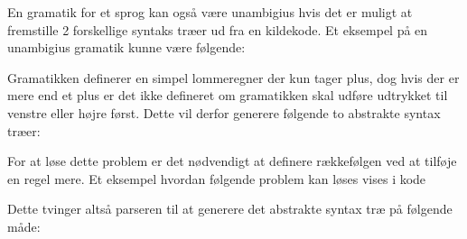 
En gramatik for et sprog kan også være unambigius hvis det er muligt at fremstille 2 forskellige syntaks træer ud fra en kildekode. Et eksempel på en unambigius gramatik kunne være følgende:


Gramatikken definerer en simpel lommeregner der kun tager plus, dog hvis der er mere end et plus er det ikke defineret om gramatikken skal udføre udtrykket til venstre eller højre først. Dette vil derfor generere følgende to abstrakte syntax træer:


For at løse dette problem er det nødvendigt at definere rækkefølgen ved at tilføje en regel mere. Et eksempel hvordan følgende problem kan løses vises i kode 


Dette tvinger altså parseren til at generere det abstrakte syntax træ på følgende måde:







